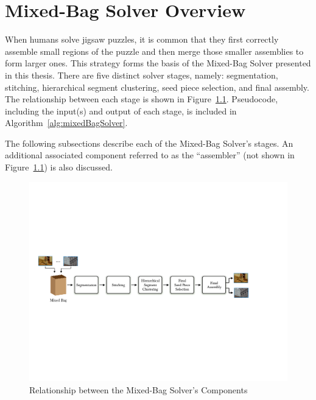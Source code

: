 \chapter{Mixed-Bag Solver Overview}\label{chap:mixedBagSolver}

When humans solve jigsaw puzzles, it is common that they first correctly assemble small regions of the puzzle and then merge those smaller assemblies to form larger ones.  This strategy forms the basis of the Mixed-Bag Solver presented in this thesis.  There are five distinct solver stages, namely: segmentation, stitching, hierarchical segment clustering, seed piece selection, and final assembly.  The relationship between each stage is shown in Figure~\ref{fig:multipuzzleSolverArchitecture}.  Pseudocode, including the input(s) and output of each stage, is included in Algorithm~\ref{alg:mixedBagSolver}. 

The following subsections describe each of the Mixed-Bag Solver's stages.  An additional associated component referred to as the ``assembler'' (not shown in Figure~\ref{fig:multipuzzleSolverArchitecture}) is also discussed.

\begin{figure}[ht!]
	\centering
		\includegraphics[width=1.0\textwidth]{images/cropped_algorithm_structure_overview.pdf}
	\caption{Relationship between the Mixed-Bag Solver's Components}\label{fig:multipuzzleSolverArchitecture}
\end{figure}

